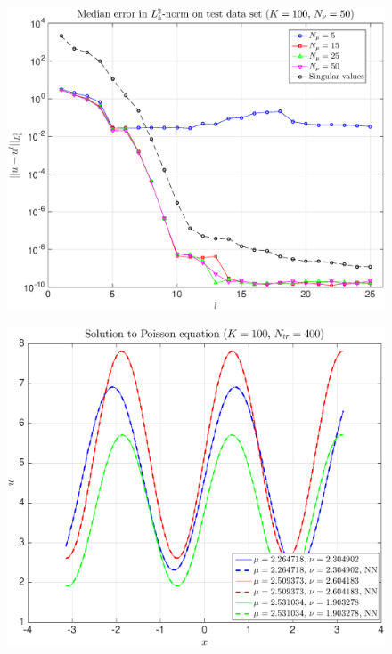 \documentclass[11pt,a4paper]{article}
\theoremstyle{definition}
\theoremstyle{theorem}
\numberwithin{equation}{section}
\begin{document}
	\begin{figure}[H]
		\center
		\includegraphics[scale = 0.5]{fig9}
		\caption{}
	\end{figure}
	
	\begin{figure}[H]
		\center
		\includegraphics[scale = 0.5]{fig10}
		\caption{}
	\end{figure}
	
\end{document}
